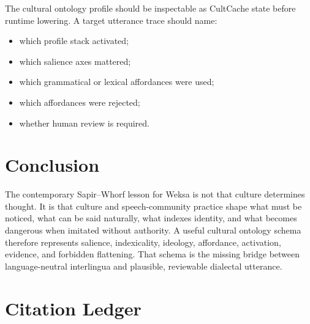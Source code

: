 \documentclass[11pt]{article}
\begin{document}
The cultural ontology profile should be inspectable as CultCache state before
runtime lowering. A target utterance trace should name:

\begin{itemize}[noitemsep]
  \item which profile stack activated;
  \item which salience axes mattered;
  \item which grammatical or lexical affordances were used;
  \item which affordances were rejected;
  \item whether human review is required.
\end{itemize}

\section{Conclusion}

The contemporary Sapir--Whorf lesson for Weksa is not that culture determines
thought. It is that culture and speech-community practice shape what must be
noticed, what can be said naturally, what indexes identity, and what becomes
dangerous when imitated without authority. A useful cultural ontology schema
therefore represents salience, indexicality, ideology, affordance, activation,
evidence, and forbidden flattening. That schema is the missing bridge between
language-neutral interlingua and plausible, reviewable dialectal utterance.

\section*{Citation Ledger}
\end{document}

